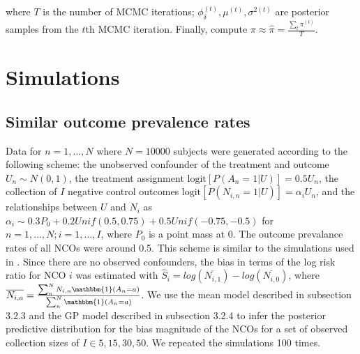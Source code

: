where $T$ is the number of MCMC iterations; $\phi_\delta^{(t)}, \mu^{(t)}, \sigma^{2(t)}$ are posterior samples from the $t$th MCMC iteration. Finally, compute $\pi \approx \hat{\pi} = \frac{\sum_t \pi^{(t)}}{T}$.

\section{Simulations}
\label{sec:nco_sim}

\subsection{Similar outcome prevalence rates}

Data for $n=1,...,N$ where $N=10000$ subjects were generated according to the following scheme: the unobserved confounder of the treatment and outcome $U_n \sim N(0, 1)$, the treatment assignment $\text{logit}[P(A_n=1|U)] = 0.5 U_n$, the collection of $I$ negative control outcomes $\text{logit}[P(N_{i,n}=1|U)] = \alpha_{i} U_n$, and the relationships between $U$ and $N_i$ as $\alpha_{i} \sim 0.3P_0 + 0.2 Unif(0.5, 0.75) + 0.5 Unif(-0.75, -0.5)$ for $n=1,...,N; i=1,...,I$, where $P_0$ is a point mass at 0.
The outcome prevalance rates of all NCOs were around 0.5.
This scheme is similar to the simulations used in \citep{gruber2016limitations}.
Since there are no observed confounders, the bias in terms of the log risk ratio for NCO $i$ was estimated with $\widehat{S}_{i} = log(\overline{N_{i,1}}) - log(\overline{N_{i,0}})$, where $\overline{N_{i,a}} = \frac{\sum_n^{N} N_{i,n} \mathbbm{1}(A_n=a)}{\sum_n^{N} \mathbbm{1}(A_n=a)}$.
We use the mean model described in subsection 3.2.3 and the GP model described in subsection 3.2.4 to infer the posterior predictive distribution for the bias magnitude of the NCOs for a set of observed collection sizes of $I \in {5, 15, 30, 50}$.
We repeated the simulations 100 times.


